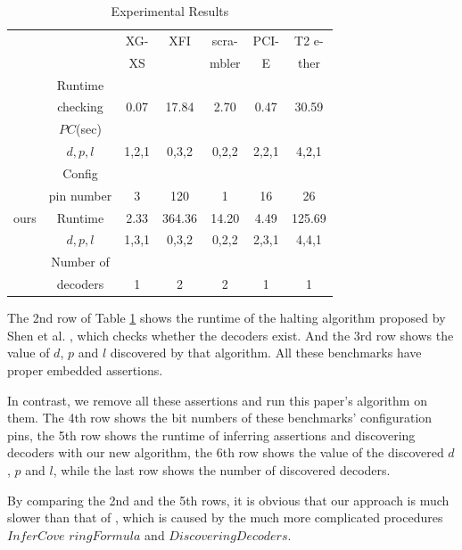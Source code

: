 \documentclass[journal]{IEEEtran}
\begin{document}
\begin{table}[t]
\centering
\caption{Experimental Results}
\begin{tabular}{|c|c|c|c|c|c|c|}
\hline
&                                        &XG-     &XFI       &scra-     &PCI-    &T2 e-\\
&                                        &XS      &          &mbler     &E         &ther\\\hline
&Runtime                           &&&&&\\
&checking                    &0.07     &17.84     &2.70      &0.47    &30.59       \\
\cite{ShengYuShen:tcad11}&$PC$(sec)     &&&&&\\\cline{2-7}
&$d,p,l$                                 &1,2,1    &0,3,2     &0,2,2     &2,2,1   &4,2,1         \\ \hline\hline
&Config                 &&&&&\\
&pin number                              &3        &120       &1         &16      &26\\\cline{2-7}
ours&Runtime                            &2.33     &364.36    &14.20      &4.49   &125.69      \\\cline{2-7}
&$d,p,l$                                 &1,3,1    &0,3,2     &0,2,2     &2,3,1   &4,4,1          \\ \cline{2-7}
&Number of                                 &&&&&          \\
&decoders                                 &1       &2         &2        &1      &1          \\ \hline
\end{tabular}\label{tab_res}
\end{table}

The 2nd row of Table \ref{tab_res} shows the runtime of
the halting algorithm proposed by Shen et al. \cite{ShengYuShen:tcad11},
which checks whether the decoders exist.
And the 3rd row shows the value of $d$, $p$ and $l$ discovered by that algorithm.
All these benchmarks have proper embedded assertions.


In contrast,
we remove all these assertions and run this paper's algorithm on them.
The 4th row shows the bit numbers of these benchmarks' configuration pins,
the 5th row shows the runtime of inferring assertions and discovering decoders with our new algorithm,
the 6th row shows the value of the discovered $d$, $p$ and $l$,
while the last row shows the number of discovered decoders.

By comparing the 2nd and the 5th rows,
it is obvious that our approach is much slower than that of \cite{ShengYuShen:tcad11},
which is caused by the much more complicated procedures $InferCove$ $ringFormula$ and $DiscoveringDecoders$.
\end{document}
